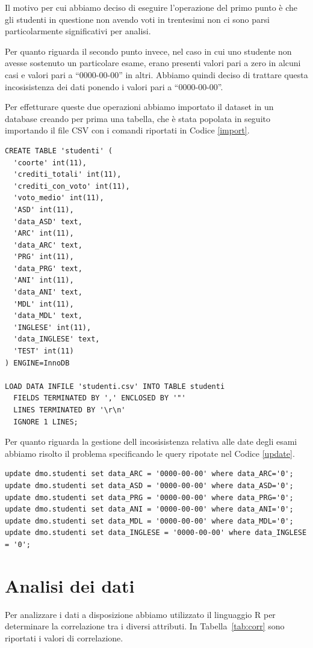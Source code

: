 \documentclass[12pt]{article}
\begin{document}
Il motivo per cui abbiamo deciso di eseguire l'operazione del primo punto è che gli studenti in questione non avendo voti in trentesimi non ci sono parsi particolarmente significativi per analisi.

Per quanto riguarda il secondo punto invece, nel caso in cui uno studente non avesse sostenuto un particolare esame, erano presenti valori pari a zero in alcuni casi e valori pari a ``0000-00-00'' in altri.
Abbiamo quindi deciso di trattare questa incosisistenza dei dati ponendo i valori pari a ``0000-00-00''.

Per effetturare queste due operazioni abbiamo importato il dataset in un database creando per prima una tabella, che è stata popolata in seguito importando il file CSV con i comandi riportati in Codice \ref{import}.
\begin{lstlisting}[caption={Creazione della table}, style=sql, label={import}, captionpos=b]
CREATE TABLE 'studenti' (
  'coorte' int(11),
  'crediti_totali' int(11),
  'crediti_con_voto' int(11),
  'voto_medio' int(11),
  'ASD' int(11),
  'data_ASD' text,
  'ARC' int(11),
  'data_ARC' text,
  'PRG' int(11),
  'data_PRG' text,
  'ANI' int(11),
  'data_ANI' text,
  'MDL' int(11),
  'data_MDL' text,
  'INGLESE' int(11),
  'data_INGLESE' text,
  'TEST' int(11)
) ENGINE=InnoDB

LOAD DATA INFILE 'studenti.csv' INTO TABLE studenti
  FIELDS TERMINATED BY ',' ENCLOSED BY '"'
  LINES TERMINATED BY '\r\n'
  IGNORE 1 LINES;
\end{lstlisting}
\newpage
Per quanto riguarda la gestione dell incosisistenza relativa alle date degli esami abbiamo risolto il problema specificando le query ripotate nel Codice \ref{update}.
\begin{lstlisting}[caption={Update della tabella},style=sql, label={update},captionpos=b]
update dmo.studenti set data_ARC = '0000-00-00' where data_ARC='0'; 
update dmo.studenti set data_ASD = '0000-00-00' where data_ASD='0'; 
update dmo.studenti set data_PRG = '0000-00-00' where data_PRG='0'; 
update dmo.studenti set data_ANI = '0000-00-00' where data_ANI='0'; 
update dmo.studenti set data_MDL = '0000-00-00' where data_MDL='0';
update dmo.studenti set data_INGLESE = '0000-00-00' where data_INGLESE = '0';
\end{lstlisting}

\section{Analisi dei dati}
Per analizzare i dati a disposizione abbiamo utilizzato il linguaggio R per determinare la correlazione tra i diversi attributi.
In Tabella~\ref{tab:corr} sono riportati i valori di correlazione.
\end{document}
